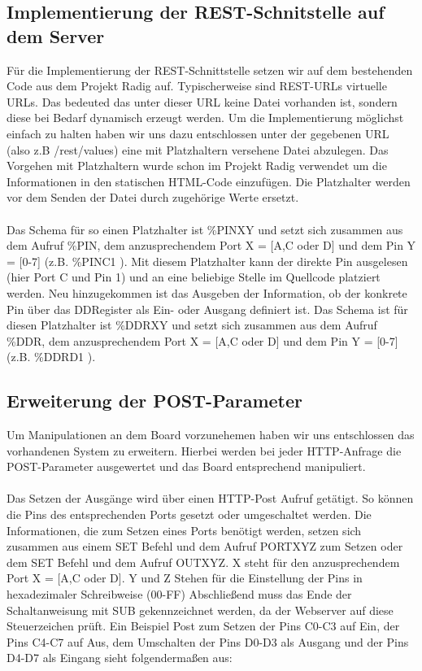 \subsection{Implementierung der REST-Schnitstelle auf dem Server}
Für die Implementierung der \ac{REST}-Schnittstelle setzen wir auf dem
bestehenden Code aus dem Projekt Radig auf. Typischerweise sind
\ac{REST}-\ac{URL}s virtuelle \ac{URL}s.
Das bedeuted das unter dieser \ac{URL} keine Datei vorhanden ist, sondern diese bei
Bedarf dynamisch erzeugt werden. Um die Implementierung möglichst einfach zu
halten haben wir uns dazu entschlossen unter der gegebenen \ac{URL} (also z.B  
\textrm{/rest/values}) eine mit Platzhaltern versehene Datei abzulegen. Das
Vorgehen mit Platzhaltern wurde schon im Projekt Radig verwendet um die
Informationen in den statischen \ac{HTML}-Code einzufügen. Die Platzhalter
werden vor dem Senden der Datei durch zugehörige Werte ersetzt.\\
\\
Das Schema für so einen Platzhalter ist \textrm{\%PINXY} und setzt sich zusammen aus dem
Aufruf \textrm{\%PIN}, dem anzusprechendem Port X = [A,C oder D] und dem Pin Y = [0-7] (z.B.
\textrm{\%PINC1 } ). Mit diesem Platzhalter kann der direkte Pin ausgelesen
(hier Port C und Pin 1) und an eine beliebige Stelle im Quellcode platziert werden. Neu
hinzugekommen ist das Ausgeben der Information, ob der konkrete Pin über das
DDRegister als Ein- oder Ausgang definiert ist. Das Schema ist für diesen
Platzhalter ist \textrm{\%DDRXY} und setzt sich zusammen aus dem Aufruf \textrm{\%DDR}, dem
anzusprechendem Port X = [A,C oder D] und dem Pin Y = [0-7] (z.B.
\textrm{\%DDRD1} ). 

\subsection{Erweiterung der POST-Parameter}
Um Manipulationen an dem Board vorzunehemen haben wir uns entschlossen das
vorhandenen System zu erweitern. Hierbei werden bei jeder \acs{HTTP}-Anfrage die
POST-Parameter ausgewertet und das Board entsprechend manipuliert.\\
\\
Das Setzen der Ausgänge wird über einen HTTP-Post Aufruf getätigt. So können die
Pins des entsprechenden Ports gesetzt oder umgeschaltet werden. Die
Informationen, die zum Setzen eines Ports benötigt werden, setzen sich zusammen
aus einem \textrm{SET} Befehl und dem Aufruf PORTXYZ zum Setzen oder dem
\textrm{SET} Befehl und dem Aufruf OUTXYZ. X steht für den anzusprechendem Port
X = [A,C oder D]. Y und Z Stehen für die Einstellung der Pins in hexadezimaler
Schreibweise (00-FF) Abschließend muss das Ende der Schaltanweisung mit
\textrm{SUB} gekennzeichnet werden, da der Webserver auf diese Steuerzeichen
prüft. Ein Beispiel Post zum Setzen der Pins C0-C3 auf Ein, der Pins C4-C7 auf
Aus, dem Umschalten der Pins D0-D3 als Ausgang und der Pins D4-D7 als Eingang
sieht folgendermaßen aus:
\\

